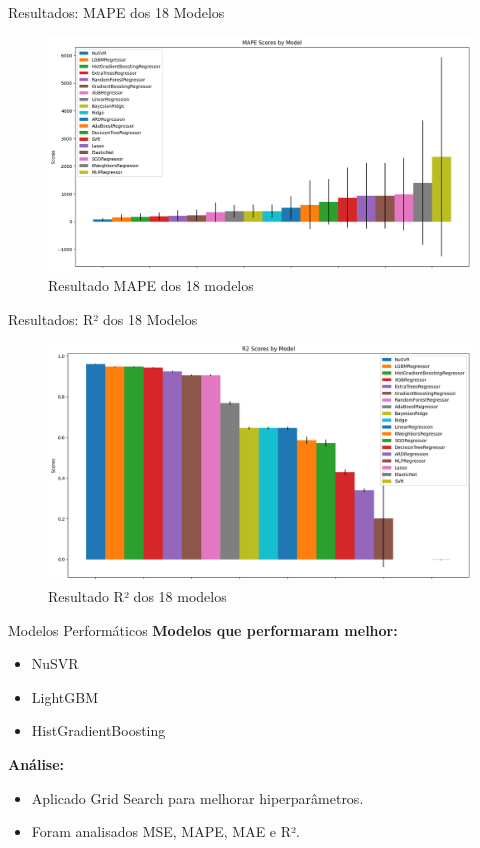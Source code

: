 \documentclass{beamer}
\begin{document}
\begin{frame}{Resultados: MAPE dos 18 Modelos}
    \begin{figure}[H]
        \centering
        \includegraphics[width=1\linewidth]{image4.png}
        \caption{Resultado MAPE dos 18 modelos}
    \end{figure}
\end{frame}

\begin{frame}{Resultados: R² dos 18 Modelos}
    \begin{figure}[H]
        \centering
        \includegraphics[width=1\linewidth]{image2.png}
        \caption{Resultado R² dos 18 modelos}
    \end{figure}
\end{frame}

\begin{frame}{Modelos Performáticos}
    \textbf{Modelos que performaram melhor:}
    \begin{itemize}
        \item NuSVR
        \item LightGBM
        \item HistGradientBoosting
    \end{itemize}
    \textbf{Análise:}
    \begin{itemize}
        \item Aplicado Grid Search para melhorar hiperparâmetros.
        \item Foram analisados MSE, MAPE, MAE e R².
    \end{itemize}
\end{frame}
\end{document}
